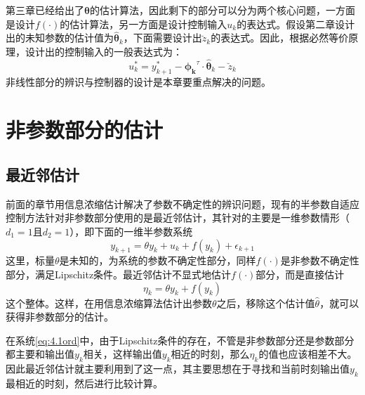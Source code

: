 第三章已经给出了$\bm{\theta}$的估计算法，因此剩下的部分可以分为两个核心问题，一方面是设计$f(\cdot)$的估计算法，另一方面是设计控制输入$u_{k}$的表达式。假设第二章设计出的未知参数的估计值为$\hat{\bm{\theta}}_{k}$，下面需要设计出$\breve{z}_{k}$的表达式。因此，根据必然等价原理，设计出的控制输入的一般表达式为：
\begin{equation}\label{eq:4.uk}
u_{k}^{*}=y_{k+1}^{*}-\bm{\phi_{k}}^{\tau}\cdot\hat{\bm{\theta}}_{k}-\breve{z}_{k}
\end{equation}
非线性部分的辨识与控制器的设计是本章要重点解决的问题。

\section{非参数部分的估计}\label{sect:4.2}
\subsection{最近邻估计}
前面的章节用信息浓缩估计解决了参数不确定性的辨识问题，现有的半参数自适应控制方法针对非参数部分使用的是最近邻估计，其针对的主要是一维参数情形（$d_{1}=1$且$d_{2}=1$），即下面的一维半参数系统
\begin{equation}%
\label{eq:4.1ord}
y_{k+1}=\theta y_{k}+u_{k}+f(y_{k})+\epsilon_{k+1}
\end{equation}
这里，标量$\theta$是未知的，为系统的参数不确定性部分，同样$f(\cdot)$是非参数不确定性部分，满足Lipschitz条件。最近邻估计不显式地估计$f(\cdot)$部分，而是直接估计
\begin{equation}\label{eq:4.nne.g}
\eta_{k} = \theta y_{k}+f(y_{k})
\end{equation}
这个整体。这样，在用信息浓缩算法估计出参数$\theta$之后，移除这个估计值$\hat{\theta}$，就可以获得非参数部分的估计。

在系统\eqref{eq:4.1ord}中，由于Lipschitz条件的存在，不管是非参数部分还是参数部分都主要和输出值$y_{k}$相关，这样输出值$y_{k}$相近的时刻，那么$\eta_{k}$的值也应该相差不大。因此最近邻估计就主要利用到了这一点，其主要思想在于寻找和当前时刻输出值$y_{k}$最相近的时刻，然后进行比较计算。

